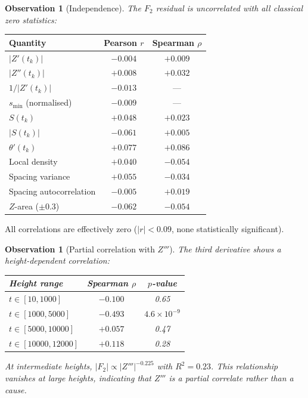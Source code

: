 \documentclass[11pt,a4paper]{article}
\newtheorem{observation}[theorem]{Observation}
\newcommand{\Ftwo}{|F_2|}
\begin{document}
\begin{observation}[Independence]\label{obs:independence}
The $F_2$ residual is uncorrelated with all classical zero statistics:
\end{observation}

\begin{center}
\begin{tabular}{lcc}
\toprule
\textbf{Quantity} & \textbf{Pearson $r$} & \textbf{Spearman $\rho$} \\
\midrule
$|Z'(t_k)|$             & $-0.004$ & $+0.009$ \\
$|Z''(t_k)|$            & $+0.008$ & $+0.032$ \\
$1/|Z'(t_k)|$           & $-0.013$ & --- \\
$s_{\min}$ (normalised) & $-0.009$ & --- \\
$S(t_k)$                & $+0.048$ & $+0.023$ \\
$|S(t_k)|$              & $-0.061$ & $+0.005$ \\
$\theta'(t_k)$          & $+0.077$ & $+0.086$ \\
Local density            & $+0.040$ & $-0.054$ \\
Spacing variance         & $+0.055$ & $-0.034$ \\
Spacing autocorrelation  & $-0.005$ & $+0.019$ \\
$Z$-area ($\pm 0.3$)    & $-0.062$ & $-0.054$ \\
\bottomrule
\end{tabular}
\end{center}

All correlations are effectively zero ($|r| < 0.09$, none statistically significant).

\begin{observation}[Partial correlation with $Z'''$]\label{obs:z3}
The third derivative shows a height-dependent correlation:
\begin{center}
\begin{tabular}{lcc}
\toprule
\textbf{Height range} & \textbf{Spearman $\rho$} & \textbf{$p$-value} \\
\midrule
$t \in [10, 1000]$     & $-0.100$ & 0.65 \\
$t \in [1000, 5000]$   & $-0.493$ & $4.6 \times 10^{-9}$ \\
$t \in [5000, 10000]$  & $+0.057$ & 0.47 \\
$t \in [10000, 12000]$ & $+0.118$ & 0.28 \\
\bottomrule
\end{tabular}
\end{center}

At intermediate heights, $\Ftwo \propto |Z'''|^{-0.225}$ with $R^2 = 0.23$.
This relationship vanishes at large heights, indicating that $Z'''$ is a partial
correlate rather than a cause.
\end{observation}
\end{document}
